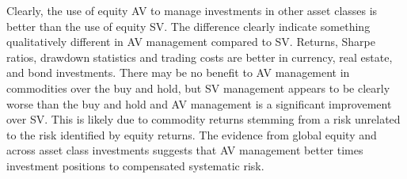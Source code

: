 Clearly, the use of equity AV to manage investments in other asset classes is better than the use of equity SV. The difference clearly indicate something qualitatively different in AV management compared to SV. Returns, Sharpe ratios, drawdown statistics and trading costs are better in currency, real estate, and bond investments. There may be no benefit to AV management in commodities over the buy and hold, but SV management appears to be clearly worse than the buy and hold and AV management is a significant improvement over SV. This is likely due to commodity returns stemming from a risk unrelated to the risk identified by equity returns. The evidence from global equity and across asset class investments suggests that AV management better times investment positions to compensated systematic risk.